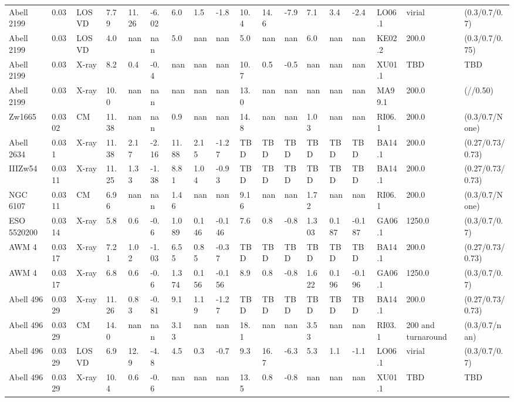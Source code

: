 \documentclass{article}
\begin{document}
\begin{center}
\begin{landscape}
\begin{longtable}{llllllllllllllllll}
Abell 2199 & 0.03 & LOSVD & 7.79 & 11.26 & -6.02 & 6.0 & 1.5 & -1.8 & 10.4 & 14.6 & -7.9 & 7.1 & 3.4 & -2.4 & LO06.1 & virial & (0.3/0.7/0.7) \\
Abell 2199 & 0.03 & LOSVD & 4.0 & nan & nan & 5.0 & nan & nan & 5.0 & nan & nan & 6.0 & nan & nan & KE02.2 & 200.0 & (0.3/0.7/0.75) \\
Abell 2199 & 0.03 & X-ray & 8.2 & 0.4 & -0.4 & nan & nan & nan & 10.7 & 0.5 & -0.5 & nan & nan & nan & XU01.1 & TBD & TBD \\
Abell 2199 & 0.03 & X-ray & 10.0 & nan & nan & nan & nan & nan & 13.0 & nan & nan & nan & nan & nan & MA99.1 & 200.0 & (//0.50) \\
Zw1665 & 0.0302 & CM & 11.38 & nan & nan & 0.9 & nan & nan & 14.8 & nan & nan & 1.03 & nan & nan & RI06.1 & 200.0 & (0.3/0.7/None) \\
Abell 2634 & 0.031 & X-ray & 11.38 & 2.17 & -2.16 & 11.88 & 2.15 & -1.27 & TBD & TBD & TBD & TBD & TBD & TBD & BA14.1 & 200.0 & (0.27/0.73/0.73) \\
IIIZw54 & 0.0311 & X-ray & 11.25 & 1.33 & -1.38 & 8.81 & 1.04 & -0.93 & TBD & TBD & TBD & TBD & TBD & TBD & BA14.1 & 200.0 & (0.27/0.73/0.73) \\
NGC 6107 & 0.0311 & CM & 6.96 & nan & nan & 1.46 & nan & nan & 9.16 & nan & nan & 1.72 & nan & nan & RI06.1 & 200.0 & (0.3/0.7/None) \\
ESO 5520200 & 0.0314 & X-ray & 5.8 & 0.6 & -0.6 & 1.089 & 0.146 & -0.146 & 7.6 & 0.8 & -0.8 & 1.303 & 0.187 & -0.187 & GA06.1 & 1250.0 & (0.3/0.7/0.7) \\
AWM 4 & 0.0317 & X-ray & 7.21 & 1.02 & -1.03 & 6.55 & 0.85 & -0.37 & TBD & TBD & TBD & TBD & TBD & TBD & BA14.1 & 200.0 & (0.27/0.73/0.73) \\
AWM 4 & 0.0317 & X-ray & 6.8 & 0.6 & -0.6 & 1.374 & 0.156 & -0.156 & 8.9 & 0.8 & -0.8 & 1.622 & 0.196 & -0.196 & GA06.1 & 1250.0 & (0.3/0.7/0.7) \\
Abell 496 & 0.0329 & X-ray & 11.26 & 0.83 & -0.81 & 9.1 & 1.19 & -1.27 & TBD & TBD & TBD & TBD & TBD & TBD & BA14.1 & 200.0 & (0.27/0.73/0.73) \\
Abell 496 & 0.0329 & CM & 14.0 & nan & nan & 3.13 & nan & nan & 18.1 & nan & nan & 3.53 & nan & nan & RI03.1 & 200 and turnaround & (0.3/0.7/nan) \\
Abell 496 & 0.0329 & LOSVD & 6.9 & 12.9 & -4.8 & 4.5 & 0.3 & -0.7 & 9.3 & 16.7 & -6.3 & 5.3 & 1.1 & -1.1 & LO06.1 & virial & (0.3/0.7/0.7) \\
Abell 496 & 0.0329 & X-ray & 10.4 & 0.6 & -0.6 & nan & nan & nan & 13.5 & 0.8 & -0.8 & nan & nan & nan & XU01.1 & TBD & TBD \\

\end{longtable}
\end{landscape}
\end{center}
\end{document}
